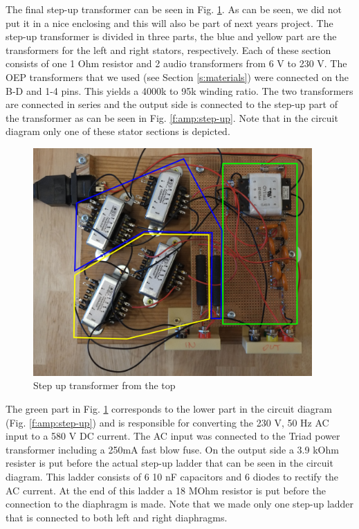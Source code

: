 \documentclass{article}
\begin{document}
The final step-up transformer can be seen in Fig. \ref{f:amp:step-up-real}. As can be seen, we did not put it in a nice enclosing and this will also be part of next years project. The step-up transformer is divided in three parts, the blue and yellow part are the transformers for the left and right stators, respectively. Each of these section consists of one 1 Ohm resistor and 2 audio transformers from 6 V to 230 V. The OEP transformers that we used (see Section \ref{s:materials}) were connected on the B-D and 1-4 pins. This yields a 4000k to 95k winding ratio. The two transformers are connected in series and the output side is connected to the step-up part of the transformer as can be seen in Fig. \ref{f:amp:step-up}. Note that in the circuit diagram only one of these stator sections is depicted.

\begin{figure}[htb]
    \centering
    \includegraphics[width=0.95\textwidth]{images/step-up-real-top.png}
    \caption{Step up transformer from the top}
    \label{f:amp:step-up-real}
\end{figure}

The green part in Fig. \ref{f:amp:step-up-real} corresponds to the lower part in the circuit diagram (Fig. \ref{f:amp:step-up}) and is responsible for converting the 230 V, 50 Hz AC input to a 580 V DC current. The AC input was connected to the Triad power transformer including a 250mA fast blow fuse. On the output side a 3.9 kOhm resister is put before the actual step-up ladder that can be seen in the circuit diagram. This ladder consists of 6 10 nF capacitors and 6 diodes to rectify the AC current. At the end of this ladder a 18 MOhm resistor is put before the connection to the diaphragm is made. Note that we made only one step-up ladder that is connected to both left and right diaphragms.
\end{document}
